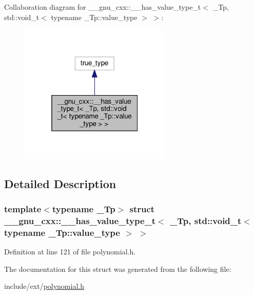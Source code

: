 Collaboration diagram for \+\_\+\+\_\+gnu\+\_\+cxx\+:\+:\+\_\+\+\_\+has\+\_\+value\+\_\+type\+\_\+t$<$ \+\_\+\+Tp, std\+:\+:void\+\_\+t$<$ typename \+\_\+\+Tp\+:\+:value\+\_\+type $>$ $>$\+:
\nopagebreak
\begin{figure}[H]
\begin{center}
\leavevmode
\includegraphics[width=205pt]{struct____gnu__cxx_1_1____has__value__type__t_3_01__Tp_00_01std_1_1void__t_3_01typename_01__Tp_19b6b1d0c9a4175ab39384b4519116c9f}
\end{center}
\end{figure}


\subsection{Detailed Description}
\subsubsection*{template$<$typename \+\_\+\+Tp$>$\newline
struct \+\_\+\+\_\+gnu\+\_\+cxx\+::\+\_\+\+\_\+has\+\_\+value\+\_\+type\+\_\+t$<$ \+\_\+\+Tp, std\+::void\+\_\+t$<$ typename \+\_\+\+Tp\+::value\+\_\+type $>$ $>$}



Definition at line 121 of file polynomial.\+h.



The documentation for this struct was generated from the following file\+:\begin{DoxyCompactItemize}
\item 
include/ext/\hyperlink{polynomial_8h}{polynomial.\+h}\end{DoxyCompactItemize}
